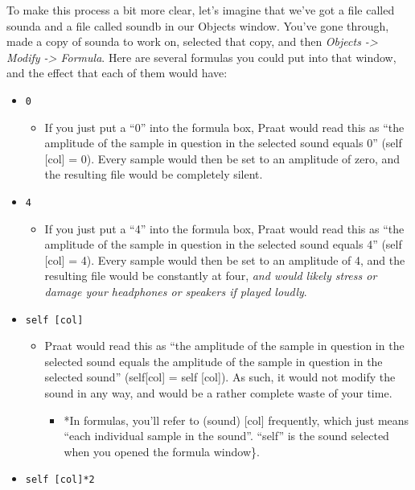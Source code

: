 To make this process a bit more clear, let's imagine that we've got a
file called sounda and a file called soundb in our Objects window.
You've gone through, made a copy of sounda to work on, selected that
copy, and then \emph{Objects -\textgreater{} Modify -\textgreater{}
Formula}. Here are several formulas you could put into that window, and
the effect that each of them would have:

\begin{itemize}
\tightlist
\item
  \texttt{0}

  \begin{itemize}
  \tightlist
  \item
    If you just put a ``0'' into the formula box, Praat would read this
    as ``the amplitude of the sample in question in the selected sound
    equals 0'' (self {[}col{]} = 0). Every sample would then be set to
    an amplitude of zero, and the resulting file would be completely
    silent.
  \end{itemize}
\item
  \texttt{4}

  \begin{itemize}
  \tightlist
  \item
    If you just put a ``4'' into the formula box, Praat would read this
    as ``the amplitude of the sample in question in the selected sound
    equals 4'' (self {[}col{]} = 4). Every sample would then be set to
    an amplitude of 4, and the resulting file would be constantly at
    four, \emph{and would likely stress or damage your headphones or
    speakers if played loudly}.
  \end{itemize}
\item
  \texttt{self [col]}

  \begin{itemize}
  \tightlist
  \item
    Praat would read this as ``the amplitude of the sample in question
    in the selected sound equals the amplitude of the sample in question
    in the selected sound'' (self{[}col{]} = self {[}col{]}). As such,
    it would not modify the sound in any way, and would be a rather
    complete waste of your time.

    \begin{itemize}
    \tightlist
    \item
      *In formulas, you'll refer to (sound) {[}col{]} frequently, which
      just means ``each individual sample in the sound''. ``self'' is
      the sound selected when you opened the formula window\}.
    \end{itemize}
  \end{itemize}
\item
  \texttt{self [col]*2}


\end{itemize}
